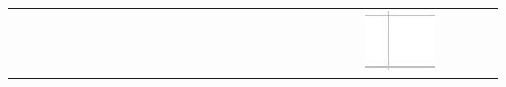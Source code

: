 \documentclass[10pt]{article}
\begin{document}
\begin{center}
\begin{tabular}{|c|c|c|c|c|c|c|c|c|c|c|c|c|c|c|c|c|c|c|c|c|c|c|c|c|c|c|c|c|c|}
 &  \\
\hline
 &  &  &  &  &  &  &  &  &  &  &  &  &  &  &  &  &  &  &  &  &  &  &  &  & \includegraphics[max width=\textwidth]{2024_11_21_94f02db55673a8a7b820g-12(1)}

\end{tabular}
\end{center}
\end{document}
